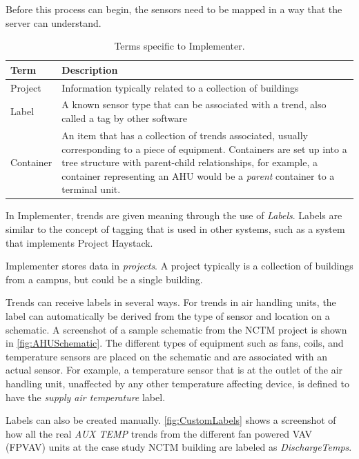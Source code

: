 Before this process can begin, the sensors need to be mapped in a
way that the server can understand. 

\begin{table}
\centering
\caption{Terms specific to Implementer.}
\label{tab:ImplementerTerms}

\begin{tabular}{lp{5in}}
\toprule
    Term    & Description                                                                                      \\  \midrule
    Project & Information typically related to a collection of buildings                                       \\
    Label   & A known sensor type that can be associated with a trend, also called a tag by other software     \\
 Container  & An item that has a collection of trends associated,
 usually corresponding to a piece of equipment. Containers are set up into a tree
 structure with parent-child relationships, for example, a container
 representing an AHU would be a \textit{parent} container to a terminal
 unit. \\ \bottomrule
\end{tabular}

\end{table}

In Implementer, trends are given meaning through the use of
\textit{Labels}. Labels are similar to the concept of tagging that is used
in other systems, such as a system that implements Project Haystack. 

Implementer stores data in \textit{projects}. A project typically is a
collection of buildings from a campus, but could be a single building. 

Trends can receive labels in several ways. For trends in air handling
units, the label can automatically be derived from the type of sensor
and location on a schematic. A screenshot of a sample schematic from the
NCTM project is shown in \figref{} \ref{fig:AHUSchematic}. The different
types of equipment such as fans, coils, and temperature sensors are
placed on the schematic and are associated with an actual sensor. For
example, a temperature sensor that is at the outlet of the air handling
unit, unaffected by any other temperature affecting device, is defined
to have the \textit{supply air temperature} label. 

Labels can also be created manually. \figref{} \ref{fig:CustomLabels}
shows a screenshot of how all the real \textit{AUX TEMP} trends from the
different fan powered VAV (FPVAV) units at the case study NCTM building
are labeled as \textit{DischargeTemps}.

